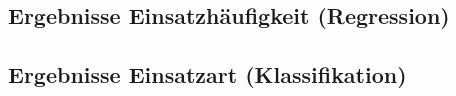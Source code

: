 \documentclass[12pt,a4paper]{article}
\begin{document}
\subsection{Ergebnisse Einsatzhäufigkeit (Regression)}
%

\subsection{Ergebnisse Einsatzart (Klassifikation)}
%
%
%
%
\end{document}
